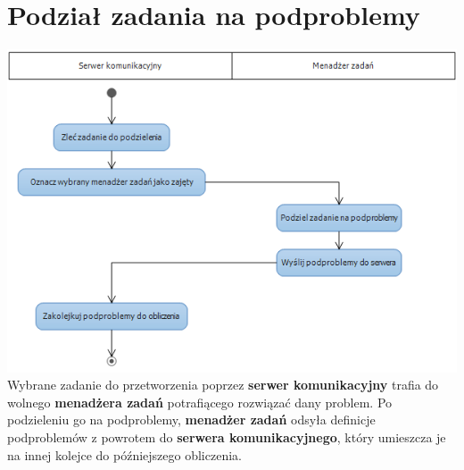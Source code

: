 \documentclass[12pt,a4paper,titlepage]{report}
\begin{document}
		\section{Podział zadania na podproblemy}
		\includegraphics[width=\textwidth]{img/diagram_cstm_taskcommision.png}
		Wybrane zadanie do przetworzenia poprzez \textbf{serwer komunikacyjny} trafia do wolnego \textbf{menadżera zadań}
		potrafiącego rozwiązać dany problem. Po podzieleniu go na podproblemy, \textbf{menadżer zadań} odsyła definicje
		podproblemów z powrotem do \textbf{serwera komunikacyjnego}, który umieszcza je na innej kolejce do późniejszego
		obliczenia.
		
\end{document}
